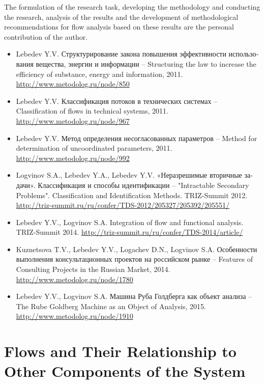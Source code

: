 \documentclass[a4paper,11pt]{article}
\begin{document}
The formulation of the research task, developing the methodology and
conducting the research, analysis of the results and the development of
methodological recommendations for flow analysis based on these results are
the personal contribution of the author.
\begin{itemize}
\item Lebedev Y.V. \foreignlanguage{russian}{Структурирование закона повышения
  эффективности использования вещества, энергии и информации} -- Structuring
  the law to increase the efficiency of substance, energy and information,
  2011.  \url{http://www.metodolog.ru/node/850}
\item Lebedev Y.V. \foreignlanguage{russian}{Классификация потоков в
  технических системах} -- Classification of flows in technical systems, 2011.
  \url{http://www.metodolog.ru/node/967}
\item Lebedev Y.V. \foreignlanguage{russian}{Метод определения несогласованных
  параметров} -- Method for determination of uncoordinated parameters, 2011.
  \url{http://www.metodolog.ru/node/992}
\item Logvinov S.A., Lebedev Y.A., Lebedev Y.V.
  \foreignlanguage{russian}{«Неразрешимые вторичные задачи».  Классификация и
    способы идентификации} -- "Intractable Secondary Problems".
  Classification and Identification Methods. TRIZ-Summit 2012.\\
  \url{http://triz-summit.ru/ru/confer/TDS-2012/205327/205392/205551/}
\item Lebedev Y.V., Logvinov S.A. Integration of flow and functional analysis.
  TRIZ-Summit 2014.  \url{http://triz-summit.ru/ru/confer/TDS-2014/article/}
\item Kuznetsova T.V., Lebedev Y.V., Logachev D.N., Logvinov S.A.
  \foreignlanguage{russian}{Особенности выполнения консультационных проектов
    на российском рынке} -- Features of Consulting Projects in the Russian
  Market, 2014.  \url{http://www.metodolog.ru/node/1780}
\item Lebedev Y.V., Logvinov S.A. \foreignlanguage{russian}{Машина Руба
  Голдберга как объект анализа} -- The Rube Goldberg Machine as an Object of
  Analysis, 2015.\\  \url{http://www.metodolog.ru/node/1910}
\end{itemize}

\section{Flows and Their Relationship to Other Components of the System}
\end{document}
